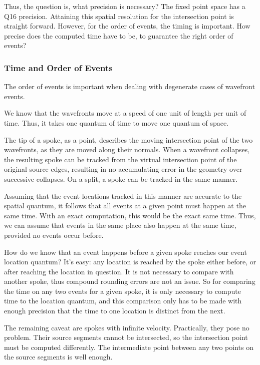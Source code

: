 \documentclass[12pt,a4paper,oneside,openany]{article}
\begin{document}
Thus, the question is, what precision is necessary? The fixed point space has a Q16 precision. Attaining this spatial resolution for the intersection point is straight forward. However, for the order of events, the timing is important. How precise does the computed time have to be, to guarantee the right order of events?

\subsubsection{Time and Order of Events}

The order of events is important when dealing with degenerate cases of wavefront events.

We know that the wavefronts move at a speed of one unit of length per unit of time. Thus, it takes one quantum of time to move one quantum of space.

The tip of a spoke, as a point, describes the moving intersection point of the two wavefronts, as they are moved along their normals. When a wavefront collapses, the resulting spoke can be tracked from the virtual intersection point of the original source edges, resulting in no accumulating error in the geometry over successive collapses. On a split, a spoke can be tracked in the same manner.

Assuming that the event locations tracked in this manner are accurate to the spatial quantum, it follows that all events at a given point must happen at the same time. With an exact computation, this would be the exact same time. Thus, we can assume that events in the same place also happen at the same time, provided no events occur before.

How do we know that an event happens before a given spoke reaches our event location quantum? It's easy: any location is reached by the spoke either before, or after reaching the location in question. It is not necessary to compare with another spoke, thus compound rounding errors are not an issue. So for comparing the time on any two events for a given spoke, it is only necessary to compute time to the location quantum, and this comparison only has to be made with enough precision that the time to one location is distinct from the next.

The remaining caveat are spokes with infinite velocity. Practically, they pose no problem. Their source segments cannot be intersected, so the intersection point must be computed differently. The intermediate point between any two points on the source segments is well enough.
\end{document}
